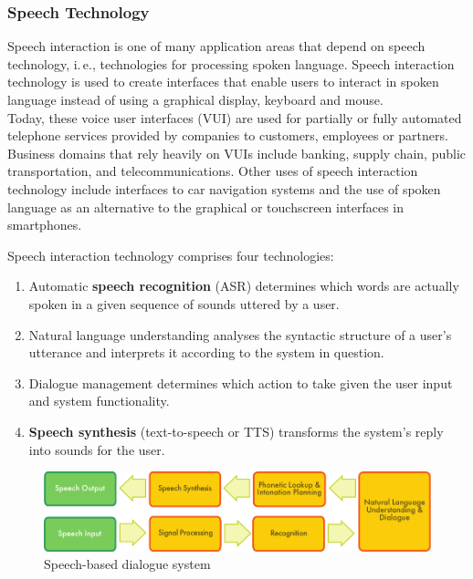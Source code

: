 \begin{multicols}{2}
\subsubsection{Speech Technology}

Speech interaction is one of many application areas that depend on speech technology, i.\,e., technologies for processing spoken language. Speech interaction technology is used to create interfaces that enable users to interact in spoken language instead of using a graphical display, keyboard and mouse.  \\
Today, these voice user interfaces (VUI) are used for partially or fully automated telephone services provided by companies to customers, employees or partners. Business domains that rely heavily on VUIs include banking, supply chain, public transportation, and telecommunications. Other uses of speech 
interaction
technology include interfaces to car navigation systems and the use of spoken language as an alternative to the graphical or touchscreen interfaces in smartphones.  

Speech 
interaction
technology comprises four technologies:

\begin{enumerate}
\item Automatic \textbf{speech recognition} (ASR) determines which words are actually
    spoken in a given sequence of sounds uttered by a user.

\item Natural language understanding analyses the syntactic structure of a user’s
    utterance and interprets it according to the system in question.

\item Dialogue management determines which action to take given the user input
    and system functionality.

\item \textbf{Speech synthesis} (text-to-speech or TTS) transforms the system’s reply into
    sounds for the user.
\end{enumerate}

\begin{figure}[htb]
  \center
  \includegraphics[width=\textwidth]{../_media/english/simple_speech-based_dialogue_architecture}
    \caption{Speech-based dialogue system}
    \label{fig:dialoguearch-eng}
  \end{figure}


\end{multicols}
